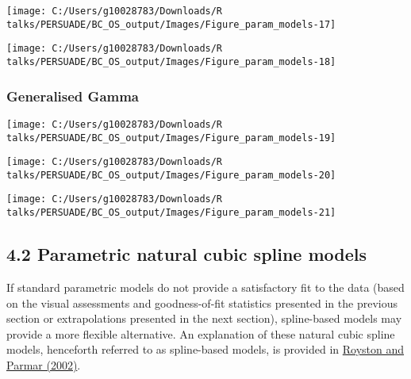 \documentclass[
]{article}
\begin{document}
\begin{flushleft}\texttt{[image: C:/Users/g10028783/Downloads/R talks/PERSUADE/BC\_OS\_output/Images/Figure\_param\_models-17]} \end{flushleft}

\begin{flushleft}\texttt{[image: C:/Users/g10028783/Downloads/R talks/PERSUADE/BC\_OS\_output/Images/Figure\_param\_models-18]} \end{flushleft}

\clearpage

\subsubsection{Generalised Gamma}\label{generalised-gamma}

\begin{flushleft}\texttt{[image: C:/Users/g10028783/Downloads/R talks/PERSUADE/BC\_OS\_output/Images/Figure\_param\_models-19]} \end{flushleft}

\begin{flushleft}\texttt{[image: C:/Users/g10028783/Downloads/R talks/PERSUADE/BC\_OS\_output/Images/Figure\_param\_models-20]} \end{flushleft}

\begin{flushleft}\texttt{[image: C:/Users/g10028783/Downloads/R talks/PERSUADE/BC\_OS\_output/Images/Figure\_param\_models-21]} \end{flushleft}

\clearpage

\subsection{4.2 Parametric natural cubic spline
models}\label{parametric-natural-cubic-spline-models}

If standard parametric models do not provide a satisfactory fit to the
data (based on the visual assessments and goodness-of-fit statistics
presented in the previous section or extrapolations presented in the
next section), spline-based models may provide a more flexible
alternative. An explanation of these natural cubic spline models,
henceforth referred to as spline-based models, is provided in
\href{https://doi.org/10.1002/sim.1203}{Royston and Parmar (2002)}.
\end{document}

